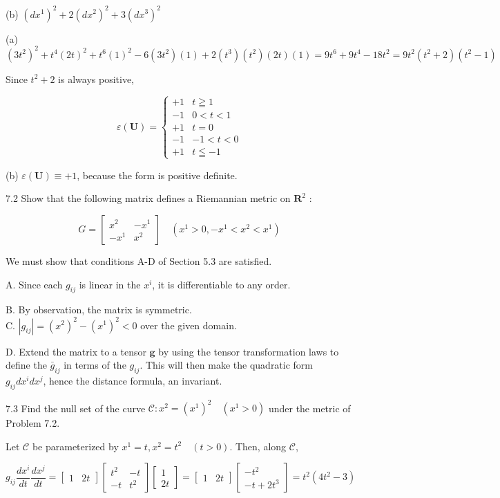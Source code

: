 \documentclass[10pt]{article}
\begin{document}
(b) $\left(d x^{1}\right)^{2}+2\left(d x^{2}\right)^{2}+3\left(d x^{3}\right)^{2}$

(a) $\left(3 t^{2}\right)^{2}+t^{4}(2 t)^{2}+t^{6}(1)^{2}-6\left(3 t^{2}\right)(1)+2\left(t^{3}\right)\left(t^{2}\right)(2 t)(1)=9 t^{6}+9 t^{4}-18 t^{2}=9 t^{2}\left(t^{2}+2\right)\left(t^{2}-1\right)$

Since $t^{2}+2$ is always positive,

$$
\varepsilon(\mathbf{U})=\left\{\begin{array}{rc}
+1 & t \geqq 1 \\
-1 & 0<t<1 \\
+1 & t=0 \\
-1 & -1<t<0 \\
+1 & t \leqq-1
\end{array}\right.
$$

(b) $\varepsilon(\mathbf{U}) \equiv+1$, because the form is positive definite.

7.2 Show that the following matrix defines a Riemannian metric on $\mathbf{R}^{2}$ :

$$
G=\left[\begin{array}{rr}
x^{2} & -x^{1} \\
-x^{1} & x^{2}
\end{array}\right] \quad\left(x^{1}>0,-x^{1}<x^{2}<x^{1}\right)
$$

We must show that conditions A-D of Section 5.3 are satisfied.

A. Since each $g_{i j}$ is linear in the $x^{i}$, it is differentiable to any order.

B. By observation, the matrix is symmetric.\\
C. $\left|g_{i j}\right|=\left(x^{2}\right)^{2}-\left(x^{1}\right)^{2}<0$ over the given domain.

D. Extend the matrix to a tensor $\mathbf{g}$ by using the tensor transformation laws to define the $\bar{g}_{i j}$ in terms of the $g_{i j}$. This will then make the quadratic form $g_{i j} d x^{i} d x^{j}$, hence the distance formula, an invariant.

7.3 Find the null set of the curve $\mathscr{C}: x^{2}=\left(x^{1}\right)^{2} \quad\left(x^{1}>0\right)$ under the metric of Problem 7.2.

Let $\mathscr{C}$ be parameterized by $x^{1}=t, x^{2}=t^{2} \quad(t>0)$. Then, along $\mathscr{C}$,

$$
g_{i j} \frac{d x^{i}}{d t} \frac{d x^{j}}{d t}=\left[\begin{array}{ll}
1 & 2 t
\end{array}\right]\left[\begin{array}{cc}
t^{2} & -t \\
-t & t^{2}
\end{array}\right]\left[\begin{array}{c}
1 \\
2 t
\end{array}\right]=\left[\begin{array}{ll}
1 & 2 t
\end{array}\right]\left[\begin{array}{c}
-t^{2} \\
-t+2 t^{3}
\end{array}\right]=t^{2}\left(4 t^{2}-3\right)
$$
\end{document}
